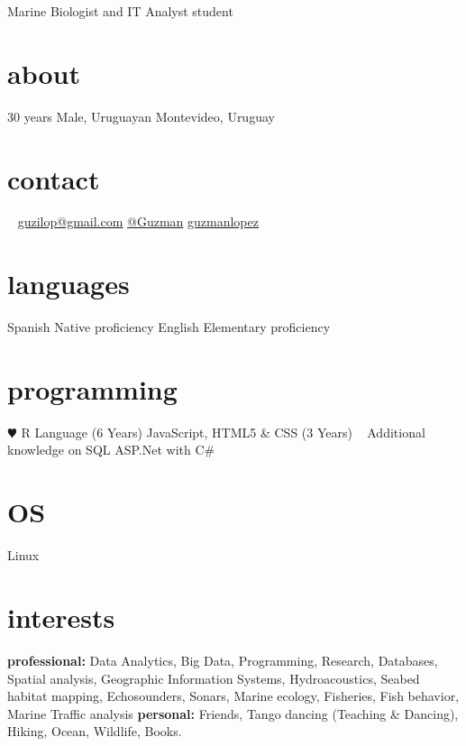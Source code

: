 \documentclass[]{friggeri-cv} %
\begin{document}
{Marine Biologist and IT Analyst student} %


\begin{aside} %
	
\section{about}
30 years
Male, Uruguayan	
{\color{orange} \faHome{}} Montevideo, Uruguay
\section{contact}~
{\color{green} \faEnvelope{}} \href{mailto:guzilop@gmail.com}{guzilop@gmail.com}
{\color{blue} \faSend{}} \href{https://telegram.me/Guzman}{@Guzman}
\faGithubAlt{} \href{https://github.com/guzmanlopez}{guzmanlopez}
\section{languages}
Spanish Native proficiency
English Elementary proficiency
\section{programming}
{\color{red} $\varheartsuit$} R Language (6 Years)
JavaScript, HTML5 \& CSS (3 Years)
~
Additional knowledge
on SQL
ASP.Net with C\#
\section{OS}
{\color{gray}\FA \faLinux} Linux
\end{aside}

\section{interests}

\textbf{professional:} Data Analytics, Big Data, Programming, Research, Databases, Spatial analysis, Geographic Information Systems, Hydroacoustics, Seabed habitat mapping, Echosounders, Sonars, Marine ecology, Fisheries, Fish behavior, Marine Traffic analysis \textbf{personal:} Friends, Tango dancing (Teaching \& Dancing), Hiking, Ocean, Wildlife, Books.\\
\end{document}
